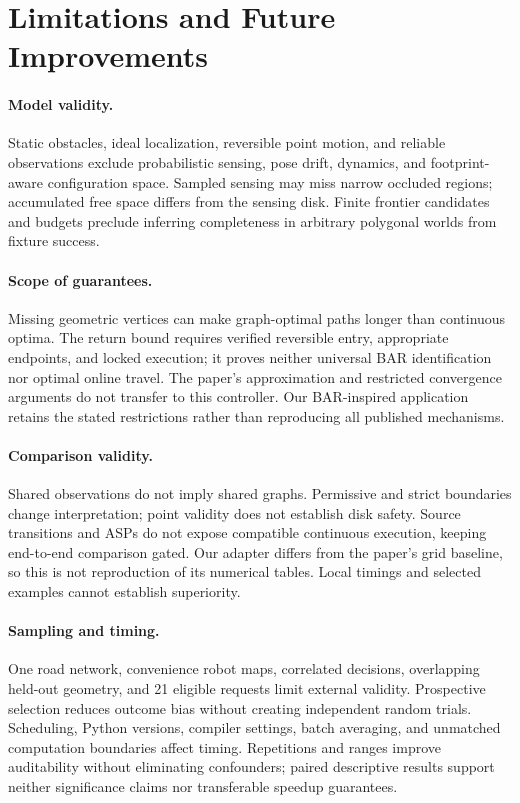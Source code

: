\section{Limitations and Future Improvements}
\paragraph{Model validity.} Static obstacles, ideal localization, reversible point motion, and reliable observations exclude probabilistic sensing, pose drift, dynamics, and footprint-aware configuration space. Sampled sensing may miss narrow occluded regions; accumulated free space differs from the sensing disk. Finite frontier candidates and budgets preclude inferring completeness in arbitrary polygonal worlds from fixture success.

\paragraph{Scope of guarantees.} Missing geometric vertices can make graph-optimal paths longer than continuous optima. The return bound requires verified reversible entry, appropriate endpoints, and locked execution; it proves neither universal BAR identification nor optimal online travel. The paper's approximation and restricted convergence arguments do not transfer to this controller. Our BAR-inspired application retains the stated restrictions rather than reproducing all published mechanisms.

\paragraph{Comparison validity.} Shared observations do not imply shared graphs. Permissive and strict boundaries change interpretation; point validity does not establish disk safety. Source transitions and ASPs do not expose compatible continuous execution, keeping end-to-end comparison gated. Our adapter differs from the paper's grid baseline, so this is not reproduction of its numerical tables. Local timings and selected examples cannot establish superiority.

\paragraph{Sampling and timing.} One road network, convenience robot maps, correlated decisions, overlapping held-out geometry, and 21 eligible requests limit external validity. Prospective selection reduces outcome bias without creating independent random trials. Scheduling, Python versions, compiler settings, batch averaging, and unmatched computation boundaries affect timing. Repetitions and ranges improve auditability without eliminating confounders; paired descriptive results support neither significance claims nor transferable speedup guarantees.

